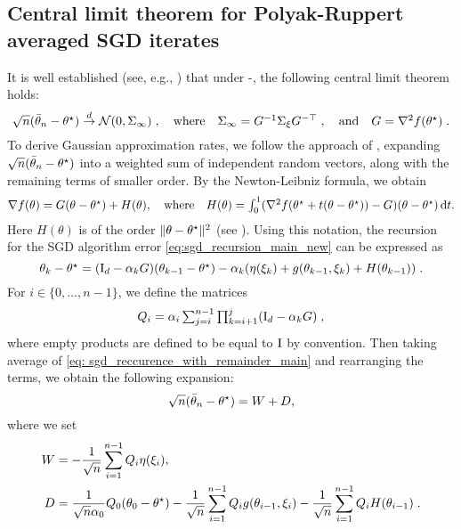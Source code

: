 \subsection{Central limit theorem for Polyak-Ruppert averaged SGD iterates}
\label{subsec:CLT_PR}
It is well established (see, e.g., \cite{polyak1992acceleration}) that under -, the following central limit theorem holds:
\begin{equation}
\label{eq:Sigma_infty_def}
\textstyle 
\sqrt{n}(\bar{\theta}_{n} - \theta^\star) \overset{d}{\to} \mathcal{N}(0,\Sigma_\infty)\;, \quad \text{where} \quad \Sigma_\infty = G^{-1} \Sigma_{\xi} G^{-\top}\;, \quad \text{and} \quad G = \nabla^2f(\theta^\star)\;.
\end{equation}
To derive Gaussian approximation rates, we follow the approach of \cite{shao2022berry}, expanding $\sqrt{n}(\bar{\theta}_{n} - \theta^\star)$ into a weighted sum of independent random vectors, along with the remaining terms of smaller order. By the Newton-Leibniz formula, we obtain
\begin{align}
\label{eq:H_theta_def}
\textstyle
\nabla f(\theta) = G(\theta-\theta^\star) + H(\theta), \quad \text{where} \quad H(\theta) = \int_{0}^1 (\nabla^2f(\theta^\star + t(\theta-\theta^\star)) - G)(\theta-\theta^\star)\, \mathrm{d} t.
\end{align}
Here $H(\theta)$ is of the order $\|\theta - \theta^\star\|^2$ (see ).  
Using this notation, the recursion for the SGD algorithm error  \eqref{eq:sgd_recursion_main_new} can be expressed as
\begin{equation}
\label{eq: sgd_reccurence_with_remainder_main}
\textstyle
\theta_k - \theta^\star = (\mathrm{I}_d - \alpha_k G) (\theta_{k-1} - \theta^\star) - \alpha_k ( \eta(\xi_k) + g(\theta_{k-1}, \xi_k) + H(\theta_{k-1}))\;.
\end{equation}
For $i \in \{0,\ldots,n-1\}$, we define the matrices
\begin{equation}
\label{eq:Q_i_def}
\textstyle
Q_i = \alpha_i\sum_{j=i}^{n-1}\prod_{k=i+1}^{j}(\mathrm{I}_d-\alpha_k G)\;,
\end{equation}
where empty products are defined to be equal to $\mathrm{I}$ by convention.
Then taking average of \eqref{eq: sgd_reccurence_with_remainder_main} and rearranging the terms, we obtain the following expansion: 
\begin{equation}
\label{eq:linear and nonlinear terms}
    \sqrt{n}(\bar\theta_n -\theta^\star) = W + D,
\end{equation}
where we set 
\begin{equation}
\label{eq: linear part}
\begin{split}
W &= - \frac{1}{\sqrt{n}}\sum_{i=1}^{n-1}Q_i\eta(\xi_i), \\ D &= \frac{1}{\sqrt{n}\alpha_0}Q_0(\theta_0-\theta^\star)-\frac{1}{\sqrt{n}}\sum_{i=1}^{n-1}Q_ig(\theta_{i-1}, \xi_i) - \frac{1}{\sqrt{n}}\sum_{i=1}^{n-1}Q_iH(\theta_{i-1})\;.
\end{split}
\end{equation}
